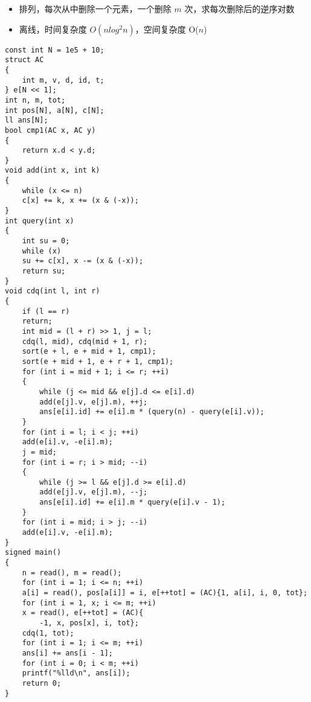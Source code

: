 \documentclass[E:/GsjzTle/main/main.tex]{subfiles}
\begin{document}
\begin{itemize}
\item
  排列，每次从中删除一个元素，一个删除 \(m\) 次，求每次删除后的逆序对数
\item
  离线，时间复杂度 \(O(nlog^2n)\)，空间复杂度 O(\(n\))
\end{itemize}

\begin{lstlisting}
const int N = 1e5 + 10;
struct AC
{
	int m, v, d, id, t;
} e[N << 1];
int n, m, tot;
int pos[N], a[N], c[N];
ll ans[N];
bool cmp1(AC x, AC y)
{
	return x.d < y.d;
}
void add(int x, int k)
{
	while (x <= n)
	c[x] += k, x += (x & (-x));
}
int query(int x)
{
	int su = 0;
	while (x)
	su += c[x], x -= (x & (-x));
	return su;
}
void cdq(int l, int r)
{
	if (l == r)
	return;
	int mid = (l + r) >> 1, j = l;
	cdq(l, mid), cdq(mid + 1, r);
	sort(e + l, e + mid + 1, cmp1);
	sort(e + mid + 1, e + r + 1, cmp1);
	for (int i = mid + 1; i <= r; ++i)
	{
		while (j <= mid && e[j].d <= e[i].d)
		add(e[j].v, e[j].m), ++j;
		ans[e[i].id] += e[i].m * (query(n) - query(e[i].v));
	}
	for (int i = l; i < j; ++i)
	add(e[i].v, -e[i].m);
	j = mid;
	for (int i = r; i > mid; --i)
	{
		while (j >= l && e[j].d >= e[i].d)
		add(e[j].v, e[j].m), --j;
		ans[e[i].id] += e[i].m * query(e[i].v - 1);
	}
	for (int i = mid; i > j; --i)
	add(e[i].v, -e[i].m);
}
signed main()
{
	n = read(), m = read();
	for (int i = 1; i <= n; ++i)
	a[i] = read(), pos[a[i]] = i, e[++tot] = (AC){1, a[i], i, 0, tot};
	for (int i = 1, x; i <= m; ++i)
	x = read(), e[++tot] = (AC){
		-1, x, pos[x], i, tot};
	cdq(1, tot);
	for (int i = 1; i <= m; ++i)
	ans[i] += ans[i - 1];
	for (int i = 0; i < m; ++i)
	printf("%lld\n", ans[i]);
	return 0;
}
\end{lstlisting}
\end{document}
